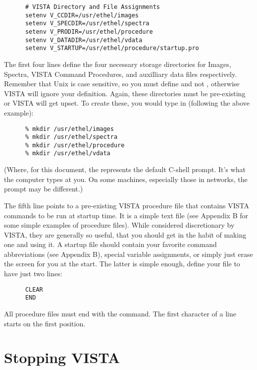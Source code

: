 \begin{verbatim}
      # VISTA Directory and File Assignments
      setenv V_CCDIR=/usr/ethel/images
      setenv V_SPECDIR=/usr/ethel/spectra
      setenv V_PRODIR=/usr/ethel/procedure
      setenv V_DATADIR=/usr/ethel/vdata
      setenv V_STARTUP=/usr/ethel/procedure/startup.pro
\end{verbatim}

The first four lines define the four necessary storage directories for Images,
Spectra, VISTA Command Procedures, and auxilliary data files respectively.
Remember that Unix is case sensitive, so you must define  and
not , otherwise VISTA will ignore your definition.  Again,
these directories must be pre-existing or VISTA will get upset.  To
create these, you would type in (following the above example):

\begin{verbatim}
      % mkdir /usr/ethel/images
      % mkdir /usr/ethel/spectra
      % mkdir /usr/ethel/procedure
      % mkdir /usr/ethel/vdata
\end{verbatim}

(Where, for this document, the \comm{\%} represents the default C-shell
prompt.  It's what the computer types at you.  On some machines, especially
those in networks, the prompt may be different.)

The fifth line points to a pre-existing VISTA procedure file that contains
VISTA commands to be run at startup time.  It is a simple text file (see
Appendix B for some simple examples of procedure files).  While considered
discretionary by VISTA, they are generally so useful, that you should get in
the habit of making one and using it.  A startup file should contain your
favorite command abbreviations (see Appendix B), special variable assignments,
or simply just erase the screen for you at the start.  The latter is simple
enough, define your file  to have just two
lines:

\begin{verbatim}
      CLEAR
      END
\end{verbatim}

All procedure files must end with the  command.  The first character
of a line starts on the first position.


\section{Stopping VISTA}

